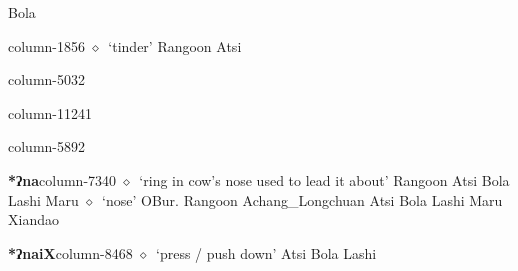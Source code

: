 \hspace{1ex}
         Bola 
  \item {\footnotesize \textbf{}}{\tiny column-1856}
         $\diamond$~`tinder'
         Rangoon 
\hspace{1ex}
         Atsi 
  \item {\footnotesize \textbf{}}{\tiny column-5032}
  \item {\footnotesize \textbf{}}{\tiny column-11241}
  \item {\footnotesize \textbf{}}{\tiny column-5892}
  \item {\footnotesize \textbf{*ʔna}}{\tiny column-7340}
         $\diamond$~`ring in cow's nose used to lead it about'
         Rangoon 
\hspace{1ex}
         Atsi 
\hspace{1ex}
         Bola 
\hspace{1ex}
         Lashi 
\hspace{1ex}
         Maru 
\hspace{1ex}
         $\diamond$~`nose'
         OBur. 
\hspace{1ex}
         Rangoon 
\hspace{1ex}
         Achang\_Longchuan 
\hspace{1ex}
         Atsi 
\hspace{1ex}
         Bola 
\hspace{1ex}
         Lashi 
\hspace{1ex}
         Maru 
\hspace{1ex}
         Xiandao 
  \item {\footnotesize \textbf{*ʔnaiX}}{\tiny column-8468}
         $\diamond$~`press / push down'
         Atsi 
\hspace{1ex}
         Bola 
\hspace{1ex}
         Lashi 
